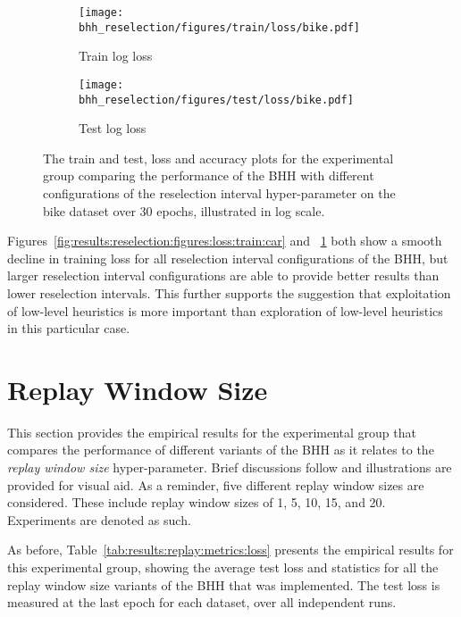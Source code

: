 \begin{figure}[htbp]
      \begin{subfigure}{0.5\textwidth}
            \centering
            \texttt{[image: bhh\_reselection/figures/train/loss/bike.pdf]}
            \caption{Train log loss}
            \label{fig:results:reselection:figures:loss:train:bike}
      \end{subfigure}
      \begin{subfigure}{0.5\textwidth}
            \centering
            \texttt{[image: bhh\_reselection/figures/test/loss/bike.pdf]}
            \caption{Test log loss}
            \label{fig:results:reselection:figures:loss:test:bike}
      \end{subfigure}
      \par\bigskip
      \caption{The train and test, loss and accuracy plots for the experimental group comparing the performance of the \acs{BHH} with different configurations of the reselection interval hyper-parameter on the bike dataset over 30 epochs, illustrated in log scale.}
      \label{fig:results:reselection:figures:bike}
\end{figure}

Figures~\ref{fig:results:reselection:figures:loss:train:car} and ~\ref{fig:results:reselection:figures:loss:train:bike} both show a smooth decline in training loss for all reselection interval configurations of the \acs{BHH}, but larger reselection interval configurations are able to provide better results than lower reselection intervals. This further supports the suggestion that exploitation of low-level heuristics is more important than exploration of low-level heuristics in this particular case.

\section{Replay Window Size}\label{sec:results:replay}

This section provides the empirical results for the experimental group that compares the performance of different variants of the \acs{BHH} as it relates to the \textit{replay window size} hyper-parameter. Brief discussions follow and illustrations are provided for visual aid. As a reminder, five different replay window sizes are considered. These include replay window sizes of 1, 5, 10, 15, and 20. Experiments are denoted as such.

As before, Table~\ref{tab:results:replay:metrics:loss} presents the empirical results for this experimental group, showing the average test loss and statistics for all the replay window size variants of the \acs{BHH} that was implemented. The test loss is measured at the last epoch for each dataset, over all independent runs.

